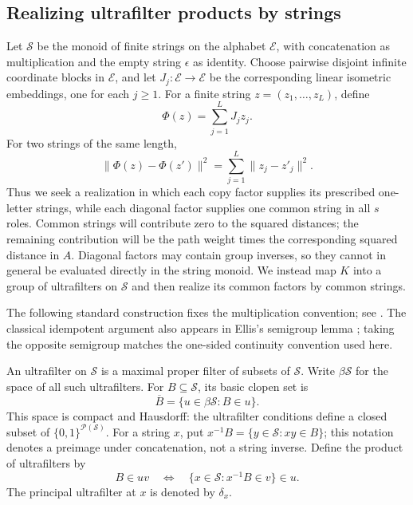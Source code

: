\subsection{Realizing ultrafilter products by strings}

Let $\mathcal S$ be the monoid of finite strings on the alphabet
$\mathcal E$, with concatenation as multiplication and the empty
string $\epsilon$ as identity. Choose pairwise disjoint infinite
coordinate blocks in $\mathcal E$, and let
$J_j:\mathcal E\to\mathcal E$ be the corresponding linear isometric
embeddings, one for each $j\ge1$. For a finite string
$z=(z_1,\ldots,z_L)$, define
\[
\Phi(z)=\sum_{j=1}^L J_jz_j.
\]
For two strings of the same length,
\begin{equation}\label{paths:string-distance}
\|\Phi(z)-\Phi(z')\|^2
=\sum_{j=1}^L\|z_j-z'_j\|^2.
\end{equation}
Thus we seek a realization in which each copy factor supplies its
prescribed one-letter strings, while each diagonal factor supplies
one common string in all $s$ roles. Common strings will contribute
zero to the squared distances; the remaining contribution will be
the path weight times the corresponding squared distance in $A$.
Diagonal factors may contain group inverses, so they cannot in general
be evaluated directly in the string monoid. We instead map $K$ into a
group of ultrafilters on $\mathcal S$ and then realize its common
factors by common strings.

The following standard construction fixes the multiplication convention; see
\cite[Theorem~2.5, Corollary~2.6, and Theorem~1.42]{hindman-strauss}.
The classical idempotent argument also appears in Ellis's semigroup lemma
\cite[Lemma~1]{ellis-idempotent}; taking the opposite semigroup matches
the one-sided continuity convention used here.

An ultrafilter on $\mathcal S$ is a maximal proper filter of subsets
of $\mathcal S$. Write $\beta\mathcal S$ for the space of all such
ultrafilters. For $B\subseteq\mathcal S$, its basic clopen set is
\[
\overline B=\{u\in\beta\mathcal S:B\in u\}.
\]
This space is compact and Hausdorff: the ultrafilter conditions define a closed
subset of $\{0,1\}^{\mathcal P(\mathcal S)}$.
For a string $x$, put $x^{-1}B=\{y\in\mathcal S:xy\in B\}$;
this notation denotes a preimage under concatenation, not a string
inverse. Define the product of ultrafilters by
\begin{equation}\label{paths:ultrafilter-product}
B\in uv
\quad\Longleftrightarrow\quad
\{x\in\mathcal S:x^{-1}B\in v\}\in u.
\end{equation}
The principal ultrafilter at $x$ is denoted by $\delta_x$.

